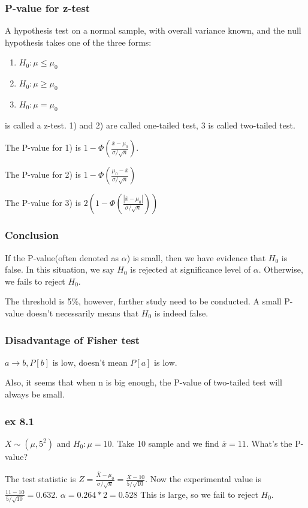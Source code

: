 \documentclass{beamer}
\begin{document}
\begin{frame}
    \frametitle{P-value for z-test}

    A hypothesis test on a normal sample, with overall variance known, and the null hypothesis takes one of the three forms:
    \begin{enumerate}
        \item $H_0:\mu\leq\mu_0$
        \item $H_0:\mu\geq\mu_0$
        \item $H_0:\mu=\mu_0$
    \end{enumerate}
    is called a z-test. 1) and 2) are called one-tailed test, 3 is called two-tailed test.\par
    The P-value for 1) is $1-\Phi(\frac{\overline{x}-\mu_0}{\sigma/\sqrt{n}})$.\par
    The P-value for 2) is $1-\Phi(\frac{\mu_0-\overline{x}}{\sigma/\sqrt{n}})$\par
    The P-value for 3) is $2(1-\Phi(\frac{|\overline{x}-\mu_0|}{\sigma/\sqrt{n}}))$

\end{frame}

\begin{frame}
    \frametitle{Conclusion}

    If the P-value(often denoted as $\alpha$) is small, then we have evidence that $H_0$ is false. In this situation, we say $H_0$ is rejected at significance level of $\alpha$. Otherwise, we fails to reject $H_0$.\par
    The threshold is 5\%, however, further study need to be conducted. A small P-value doesn't necessarily means that $H_0$ is indeed false.

\end{frame}



\begin{frame}
    \frametitle{Disadvantage of Fisher test}

    $a\rightarrow b,P[b] \text{ is low}$, doesn't mean $P[a]$ is low.\par
    \vspace*{0.3cm}
    Also, it seems that when n is big enough, the P-value of two-tailed test will always be small.

\end{frame}

\begin{frame}
    \frametitle{ex 8.1}
    $X\sim(\mu, 5^2)$ and $H_0: \mu=10$. Take 10 sample and we find $\overline{x}=11$. What's the P-value?\par
    \vspace*{0.3cm}

    The test statistic is $Z=\frac{\overline{X}-\mu_0}{\sigma/\sqrt{n}}=\frac{\overline{X}-10}{5/\sqrt{10}}$. Now the experimental value is $\frac{11-10}{5/\sqrt{10}}=0.632$. $\alpha=0.264*2=0.528$ This is large, so we fail to reject $H_0$.
    

\end{frame}
\end{document}
